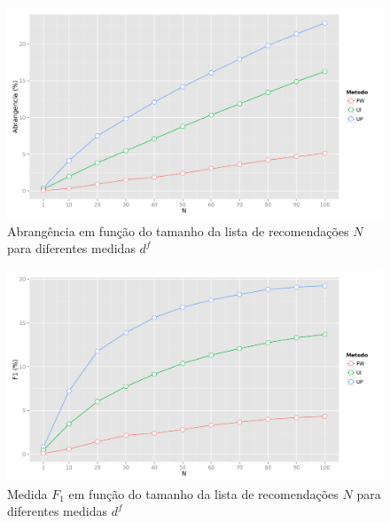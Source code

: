 {\begin{figure}[hp]
    \begin{center}
    \includegraphics[width=1\textwidth]{img/recall_N_d}
    \end{center}
    \caption{Abrangência em função do tamanho da lista de recomendações $N$ para diferentes medidas $d^f$}
    \label{fig:recall_N_d}
\end{figure}

\begin{figure}[hp]
    \begin{center}
    \includegraphics[width=1\textwidth]{img/F1_N_d}
    \end{center}
    \caption{Medida $F_1$ em função do tamanho da lista de recomendações $N$ para diferentes medidas $d^f$}
    \label{fig:F1_N_d}
\end{figure}


}
